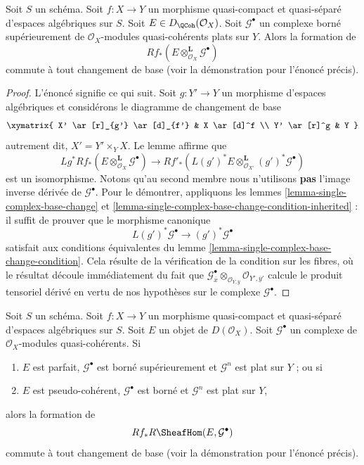 \begin{lemma}
\label{lemma-base-change-tensor}
Soit $S$ un schéma. Soit $f : X \to Y$ un morphisme quasi-compact et
quasi-séparé d'espaces algébriques sur $S$.
Soit $E \in D_\QCoh(\mathcal{O}_X)$.
Soit $\mathcal{G}^\bullet$ un complexe borné supérieurement de
$\mathcal{O}_X$-modules quasi-cohérents plats sur $Y$.
Alors la formation de
$$
Rf_*(E \otimes^\mathbf{L}_{\mathcal{O}_X} \mathcal{G}^\bullet)
$$
commute à tout changement de base (voir la démonstration pour l'énoncé précis).
\end{lemma}

\begin{proof}
L'énoncé signifie ce qui suit. Soit $g : Y' \to Y$ un morphisme d'espaces
algébriques et considérons le diagramme de changement de base
$$
\xymatrix{
X' \ar[r]_{g'} \ar[d]_{f'} &
X \ar[d]^f \\
Y' \ar[r]^g &
Y
}
$$
autrement dit, $X' = Y' \times_Y X$. Le lemme affirme que
$$
Lg^*Rf_*(E \otimes^\mathbf{L}_{\mathcal{O}_X} \mathcal{G}^\bullet)
\longrightarrow
Rf'_*(L(g')^*E \otimes^\mathbf{L}_{\mathcal{O}_{X'}} (g')^*\mathcal{G}^\bullet)
$$
est un isomorphisme. Notons qu'au second membre nous n'utilisons {\bf pas}
l'image inverse dérivée de $\mathcal{G}^\bullet$.
Pour le démontrer, appliquons les lemmes \ref{lemma-single-complex-base-change} et
\ref{lemma-single-complex-base-change-condition-inherited} : il
suffit de prouver que le morphisme canonique
$$
L(g')^*\mathcal{G}^\bullet \to (g')^*\mathcal{G}^\bullet
$$
satisfait aux conditions équivalentes du
lemme \ref{lemma-single-complex-base-change-condition}.
Cela résulte de la vérification de la condition sur les fibres, où le résultat
découle immédiatement du fait que
$\mathcal{G}^\bullet_{\overline{x}}
\otimes_{\mathcal{O}_{Y, \overline{y}}}
\mathcal{O}_{Y', \overline{y}'}$
calcule le produit tensoriel dérivé en vertu de nos hypothèses sur le complexe
$\mathcal{G}^\bullet$.
\end{proof}

\begin{lemma}
\label{lemma-base-change-RHom}
Soit $S$ un schéma. Soit $f : X \to Y$ un morphisme quasi-compact et
quasi-séparé d'espaces algébriques sur $S$. Soit $E$
un objet de $D(\mathcal{O}_X)$. Soit $\mathcal{G}^\bullet$
un complexe de $\mathcal{O}_X$-modules quasi-cohérents. Si
\begin{enumerate}
\item $E$ est parfait, $\mathcal{G}^\bullet$ est borné supérieurement
et $\mathcal{G}^n$ est plat sur $Y$ ; ou si
\item $E$ est pseudo-cohérent, $\mathcal{G}^\bullet$ est borné
et $\mathcal{G}^n$ est plat sur $Y$,
\end{enumerate}
alors la formation de
$$
Rf_*R\SheafHom(E, \mathcal{G}^\bullet)
$$
commute à tout changement de base (voir la démonstration pour l'énoncé précis).
\end{lemma}

